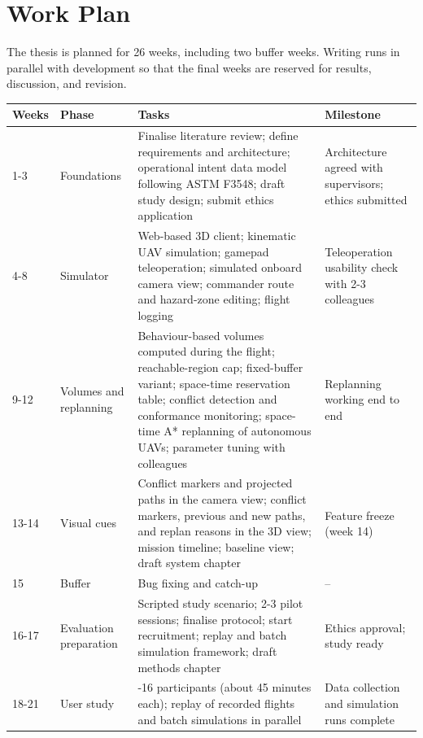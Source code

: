 \documentclass{article}
\begin{document}
\section{Work Plan}

The thesis is planned for 26 weeks, including two buffer weeks. Writing runs in parallel with development so that the final weeks are reserved for results, discussion, and revision.

\begin{table}[h]
\centering
\small
\renewcommand{\arraystretch}{1.3}
\begin{tabularx}{\textwidth}{@{}l>{\raggedright\arraybackslash}p{2.3cm}>{\raggedright\arraybackslash}X>{\raggedright\arraybackslash}p{3.2cm}@{}}
\toprule
\textbf{Weeks} & \textbf{Phase} & \textbf{Tasks} & \textbf{Milestone} \\
\midrule
1-3 & Foundations & Finalise literature review; define requirements and architecture; operational intent data model following ASTM F3548; draft study design; submit ethics application & Architecture agreed with supervisors; ethics submitted \\
4-8 & Simulator & Web-based 3D client; kinematic UAV simulation; gamepad teleoperation; simulated onboard camera view; commander route and hazard-zone editing; flight logging & Teleoperation usability check with 2-3 colleagues \\
9-12 & Volumes and replanning & Behaviour-based volumes computed during the flight; reachable-region cap; fixed-buffer variant; space-time reservation table; conflict detection and conformance monitoring; space-time A* replanning of autonomous UAVs; parameter tuning with colleagues & Replanning working end to end \\
13-14 & Visual cues & Conflict markers and projected paths in the camera view; conflict markers, previous and new paths, and replan reasons in the 3D view; mission timeline; baseline view; draft system chapter & Feature freeze (week 14) \\
15 & Buffer & Bug fixing and catch-up & -- \\
16-17 & Evaluation preparation & Scripted study scenario; 2-3 pilot sessions; finalise protocol; start recruitment; replay and batch simulation framework; draft methods chapter & Ethics approval; study ready \\
18-21 & User study & 12-16 participants (about 45 minutes each); replay of recorded flights and batch simulations in parallel & Data collection and simulation runs complete \\

\end{tabularx}
\end{table}
\end{document}
